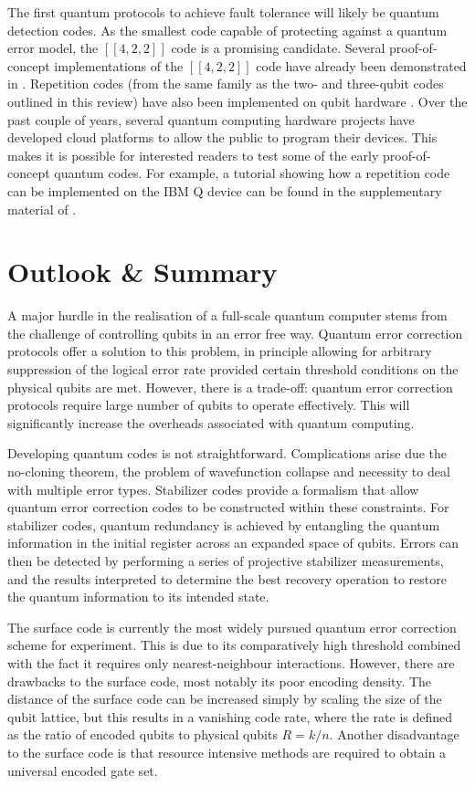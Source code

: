 \documentclass[]{arxiv}
\theoremstyle{plain}%
\theoremstyle{definition}
\theoremstyle{remark}
\begin{document}
The first quantum protocols to achieve fault tolerance will likely be quantum detection codes. As the smallest code capable of protecting against a quantum error model, the $[[4,2,2]]$ code is a promising candidate. Several proof-of-concept implementations of the $[[4,2,2]]$ code have already been demonstrated in \cite{Linke17,Vuillot18,Roffe18,Harper19}. Repetition codes (from the same family as the two- and three-qubit codes outlined in this review) have also been implemented on qubit hardware \cite{Wootton2018}. Over the past couple of years, several quantum computing hardware projects have developed cloud platforms to allow the public to program their devices. This makes it is possible for interested readers to test some of the early proof-of-concept quantum codes. For example, a tutorial showing how a repetition code can be implemented on the IBM Q device can be found in the supplementary material of \cite{Wootton2018}.    
  
\section{Outlook \& Summary}\label{sec:outlook}
A major hurdle in the realisation of a full-scale quantum computer stems from the challenge  of controlling qubits in an error free way. Quantum error correction protocols offer a solution to this problem, in principle allowing for arbitrary suppression of the logical error rate provided certain threshold conditions on the physical qubits are met. However, there is a trade-off: quantum error correction protocols require large number of qubits to operate effectively. This will significantly increase the overheads associated with quantum computing.

Developing quantum codes is not straightforward. Complications arise due the no-cloning theorem, the problem of wavefunction collapse and necessity to deal with multiple error types. Stabilizer codes provide a formalism that allow quantum error correction codes to be constructed within these constraints. For stabilizer codes, quantum redundancy is achieved by entangling the quantum information in the initial register across an expanded space of qubits. Errors can then be detected by performing a series of projective stabilizer measurements, and the results interpreted to determine the best recovery operation to restore the quantum information to its intended state.

The surface code is currently the most widely pursued quantum error correction scheme for experiment. This is due to its comparatively high threshold combined with the fact it requires only nearest-neighbour interactions. However, there are drawbacks to the surface code, most notably its poor encoding density. The distance of the surface code can be increased simply by scaling the size of the qubit lattice, but this results in a vanishing code rate, where the rate is defined as the ratio of encoded qubits to physical qubits $R=k/n$. Another disadvantage to the surface code is that resource intensive methods are required to obtain a universal encoded gate set. 
\end{document}
